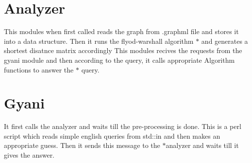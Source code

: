 \hypertarget{index_Analyzer}{}\section{\-Analyzer}\label{index_Analyzer}
\-This modules when first called reads the graph from .graphml file and stores it into a data structure. \-Then it runs the flyod-\/warshall algorithm $\ast$ and generates a shortest disatnce matrix accordingly \-This modules recives the requests from the gyani module and then according to the query, it calls appropriate \-Algorithm functions to answer the $\ast$ query. \hypertarget{index_Gyani}{}\section{\-Gyani}\label{index_Gyani}
\-It first calls the analyzer and waits till the pre-\/processing is done. \-This is a perl script which reads simple english queries from std\-::in and then makes an appropriate guess. \-Then it sends this message to the $\ast$analyzer and waits till it gives the answer. 